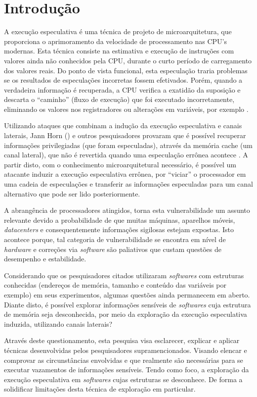 \documentclass[conference]{IEEEtran}
\begin{document}
\section{Introdução}
A execução especulativa é uma técnica de projeto de microarquitetura, que proporciona o aprimoramento da velocidade de processamento nas CPU's modernas. Esta técnica consiste na estimativa e execução de instruções com valores ainda não conhecidos pela CPU, durante o curto período de carregamento dos valores reais. Do ponto de vista funcional, esta especulação traria problemas se os resultados de especulações incorretas fossem efetivados. Porém, quando a verdadeira informação é recuperada, a CPU verifica a exatidão da suposição e descarta o ``caminho'' (fluxo de execução) que foi executado incorretamente, eliminando os valores nos registradores ou alterações em variáveis, por exemplo \cite{Intel2016Architectures}.

Utilizando ataques que combinam a indução da execução especulativa e canais laterais, Jann Horn (\citeyear{Jann2018Reading}) e outros pesquisadores provaram que é possível recuperar informações privilegiadas (que foram especuladas), através da memória cache (um canal lateral), que não é revertida quando uma especulação errônea acontece \cite{Kocher2018Spectre}. A partir disto, com o conhecimento microarquitetural necessário, é possível um atacante induzir a execução especulativa errônea, por ``viciar'' o processador em uma cadeia de especulações e transferir as informações especuladas para um canal alternativo que pode ser lido posteriormente.

A abrangência de processadores atingidos, torna esta vulnerabilidade um assunto relevante devido a probabilidade de que muitas máquinas, aparelhos móveis, \emph{datacenters} e consequentemente informações sigilosas estejam expostas. Isto acontece porque, tal categoria de vulnerabilidade se encontra em nível de \emph{hardware} e correções via \emph{software} são paliativos que custam questões de desempenho e estabilidade.

Considerando que os pesquisadores citados utilizaram \emph{softwares} com estruturas conhecidas (endereços de memória, tamanho e conteúdo das variáveis por exemplo) em seus experimentos, algumas questões ainda permanecem em aberto. Diante disto, é possível explorar informações sensíveis de \emph{softwares} cuja estrutura de memória seja desconhecida, por meio da exploração da execução especulativa induzida, utilizando canais laterais?

Através deste questionamento, esta pesquisa visa esclarecer, explicar e aplicar técnicas desenvolvidas pelos pesquisadores supramencionados. Visando elencar e comprovar as circunstâncias envolvidas e que realmente são necessárias para se executar vazamentos de informações sensíveis. Tendo como foco, a exploração da execução especulativa em \emph{softwares} cujas estruturas se desconhece. De forma a solidificar limitações desta técnica de exploração em particular.
\end{document}
